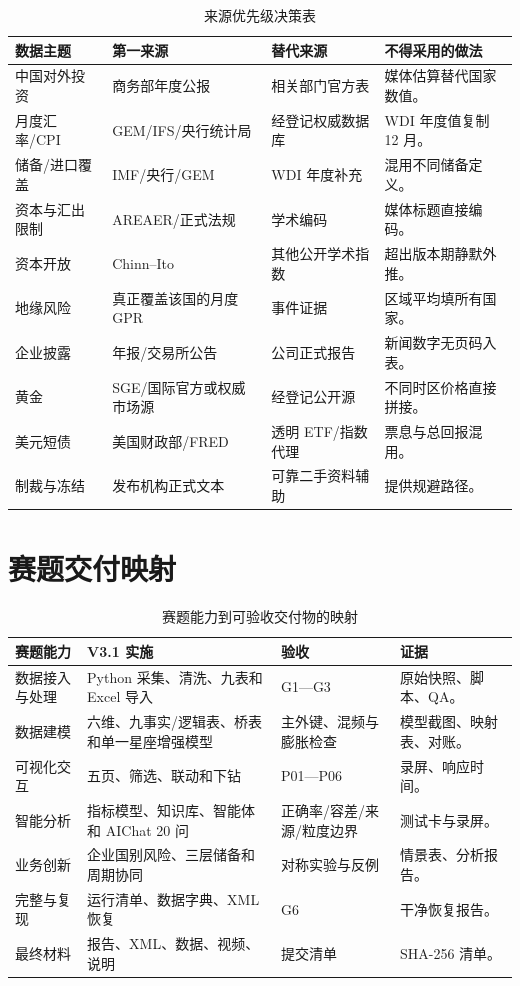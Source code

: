 \documentclass[UTF8,fontset=windows,12pt,openany]{ctexbook}
\begin{document}
\begin{longtable}{p{3.5cm}p{3.3cm}p{3.1cm}p{3.5cm}}
\caption{来源优先级决策表}\label{tab:source-priority}\\
\toprule
\textbf{数据主题} & \textbf{第一来源} & \textbf{替代来源} & \textbf{不得采用的做法}\\
\midrule
中国对外投资 & 商务部年度公报 & 相关部门官方表 & 媒体估算替代国家数值。\\
月度汇率/CPI & GEM/IFS/央行统计局 & 经登记权威数据库 & WDI 年度值复制 12 月。\\
储备/进口覆盖 & IMF/央行/GEM & WDI 年度补充 & 混用不同储备定义。\\
资本与汇出限制 & AREAER/正式法规 & 学术编码 & 媒体标题直接编码。\\
资本开放 & Chinn--Ito & 其他公开学术指数 & 超出版本期静默外推。\\
地缘风险 & 真正覆盖该国的月度 GPR & 事件证据 & 区域平均填所有国家。\\
企业披露 & 年报/交易所公告 & 公司正式报告 & 新闻数字无页码入表。\\
黄金 & SGE/国际官方或权威市场源 & 经登记公开源 & 不同时区价格直接拼接。\\
美元短债 & 美国财政部/FRED & 透明 ETF/指数代理 & 票息与总回报混用。\\
制裁与冻结 & 发布机构正式文本 & 可靠二手资料辅助 & 提供规避路径。\\
\bottomrule
\end{longtable}

\chapter{赛题交付映射}

\begin{longtable}{p{3.1cm}p{4.1cm}p{3.4cm}p{3.2cm}}
\caption{赛题能力到可验收交付物的映射}\label{tab:competition-map}\\
\toprule
\textbf{赛题能力} & \textbf{V3.1 实施} & \textbf{验收} & \textbf{证据}\\
\midrule
数据接入与处理 & Python 采集、清洗、九表和 Excel 导入 & G1—G3 & 原始快照、脚本、QA。\\
数据建模 & 六维、九事实/逻辑表、桥表和单一星座增强模型 & 主外键、混频与膨胀检查 & 模型截图、映射表、对账。\\
可视化交互 & 五页、筛选、联动和下钻 & P01—P06 & 录屏、响应时间。\\
智能分析 & 指标模型、知识库、智能体和 AIChat 20 问 & 正确率/容差/来源/粒度边界 & 测试卡与录屏。\\
业务创新 & 企业国别风险、三层储备和周期协同 & 对称实验与反例 & 情景表、分析报告。\\
完整与复现 & 运行清单、数据字典、XML 恢复 & G6 & 干净恢复报告。\\
最终材料 & 报告、XML、数据、视频、说明 & 提交清单 & SHA-256 清单。\\
\bottomrule
\end{longtable}
\end{document}

